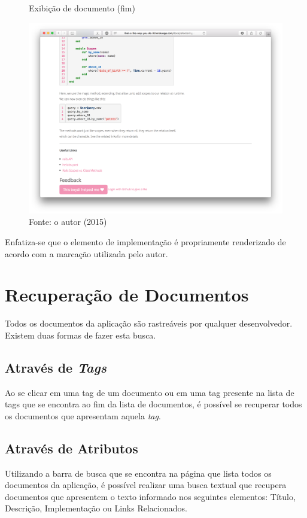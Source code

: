 \begin{figure}[h]
	\centering
    \caption{Exibição de documento (fim)}
    \includegraphics[width=15cm]{Imagens/print-show-3.png}
	\caption*{Fonte: o autor (2015)}
\end{figure}

Enfatiza-se que o elemento de implementação é propriamente renderizado de acordo com a marcação utilizada pelo autor.

\section{Recuperação de Documentos}

Todos os documentos da aplicação são rastreáveis por qualquer desenvolvedor. Existem duas formas de fazer esta busca.

\subsection{Através de \textit{Tags}}

Ao se clicar em uma tag de um documento ou em uma tag presente na lista de tags que se encontra ao fim da lista de documentos, é possível se recuperar todos os documentos que apresentam aquela \textit{tag}.

\subsection{Através de Atributos}

Utilizando a barra de busca que se encontra na página que lista todos os documentos da aplicação, é possível realizar uma busca textual que recupera documentos que apresentem o texto informado nos seguintes elementos: Título, Descrição, Implementação ou Links Relacionados.

